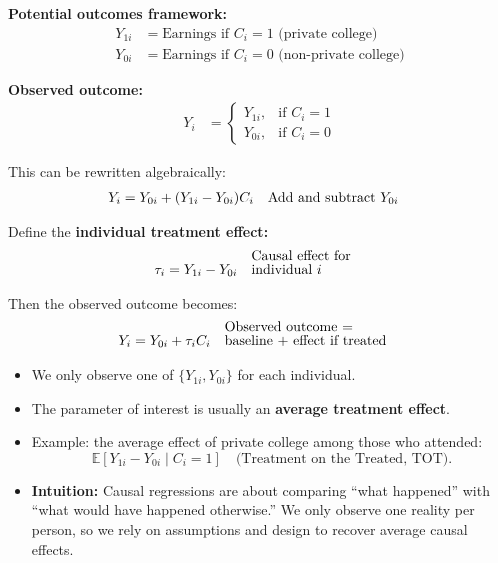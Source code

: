 \documentclass[12pt]{article}
\begin{document}
\noindent \textbf{Potential outcomes framework:}  
\begin{align}
Y_{1i} &= \text{Earnings if $C_i=1$ (private college)} \\
Y_{0i} &= \text{Earnings if $C_i=0$ (non-private college)}
\end{align}

\noindent \textbf{Observed outcome:}  
\begin{align}
Y_i &= 
\begin{cases} 
Y_{1i}, & \text{if } C_i = 1 \\ 
Y_{0i}, & \text{if } C_i = 0 
\end{cases}
\end{align}

\noindent This can be rewritten algebraically:  
\begin{align}
Y_i &= Y_{0i} + (Y_{1i} - Y_{0i})C_i && \text{\shortstack[l]{Add and subtract $Y_{0i}$}}
\end{align}

\noindent Define the \textbf{individual treatment effect:}  
\begin{align}
\tau_i &= Y_{1i} - Y_{0i} && \text{\shortstack[l]{Causal effect for \\ individual $i$}}
\end{align}

\noindent Then the observed outcome becomes:  
\begin{align}
Y_i &= Y_{0i} + \tau_i C_i && \text{\shortstack[l]{Observed outcome = \\ baseline + effect if treated}}
\end{align}

\begin{itemize}
    \item We only observe one of $\{Y_{1i}, Y_{0i}\}$ for each individual.  
    \item The parameter of interest is usually an \textbf{average treatment effect}.  
    \item Example: the average effect of private college among those who attended:  
    \[
    \mathbb{E}[Y_{1i} - Y_{0i} \mid C_i=1] \quad \text{(Treatment on the Treated, TOT)}.
    \]
    \item \textbf{Intuition:} Causal regressions are about comparing “what happened” with “what would have happened otherwise.”  
          We only observe one reality per person, so we rely on assumptions and design to recover average causal effects.
\end{itemize}
\end{document}
